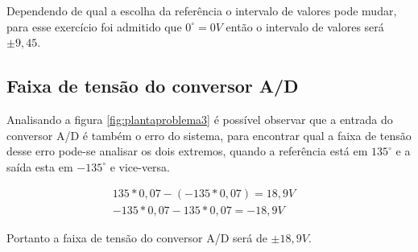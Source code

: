 \documentclass[a4paper,12pt]{article}
\begin{document}
		Dependendo de qual a escolha da referência o intervalo de valores pode mudar, para esse exercício foi admitido que $0^\circ = 0V$ então o intervalo de valores será $\pm 9,45$.
		
	\subsection{Faixa de tensão do conversor A/D}
		Analisando a figura \ref{fig:plantaproblema3} é possível observar que a entrada do conversor A/D é também o erro do sistema, para encontrar qual a faixa de tensão desse erro pode-se analisar os dois extremos, quando a referência está em $135^\circ$ e a saída esta em $-135^\circ$  e vice-versa.
		
		
		\begin{equation}
			\left.
			\begin{array}{c}
				\displaystyle 135*0,07 - (-135*0,07) = 18,9V \\[10pt]
				\displaystyle -135*0,07 - 135*0,07 = -18,9V 
			\end{array}
			\right.
			\quad 
		\end{equation}
		
		Portanto a faixa de tensão do conversor A/D será de $\pm18,9V$.
		
\end{document}

